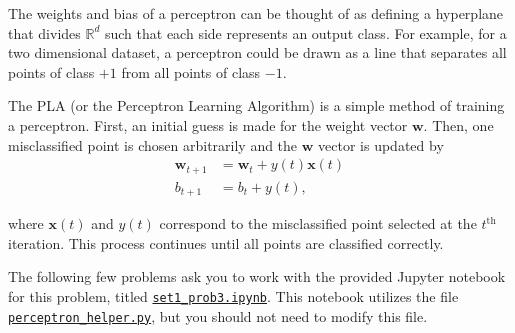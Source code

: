 The weights and bias of a perceptron can be thought of as defining a hyperplane that divides $\mathbb{R}^d$ such that each side represents an output class. For example, for a two dimensional dataset, a perceptron could be drawn as a line that separates all points of class $+1$ from all points of class $-1$.

The PLA (or the Perceptron Learning Algorithm) is a simple method of training a perceptron. First, an initial guess is made for the weight vector $\mathbf{w}$. Then, one misclassified point is chosen arbitrarily and the $\mathbf{w}$ vector is updated by
\begin{align*}
  \mathbf{w}_{t+1} &= \mathbf{w}_t + y(t)\mathbf{x}(t) \\
  b_{t + 1} &= b_t + y(t),
\end{align*}

where $\mathbf{x}(t)$ and $y(t)$ correspond to the misclassified point selected at the $t^\text{th}$ iteration.
This process continues until all points are classified correctly.

The following few problems ask you to work with the provided Jupyter notebook for this problem, titled \href{https://github.com/lakigigar/Caltech-CS155-2021/blob/main/psets/set1/set1_prob3.ipynb}{\texttt{set1_prob3.ipynb}}. This notebook utilizes the file \href{https://github.com/lakigigar/Caltech-CS155-2021/blob/main/psets/set1/perceptron_helper.py}{\texttt{perceptron_helper.py}}, but you should not need to modify this file.

